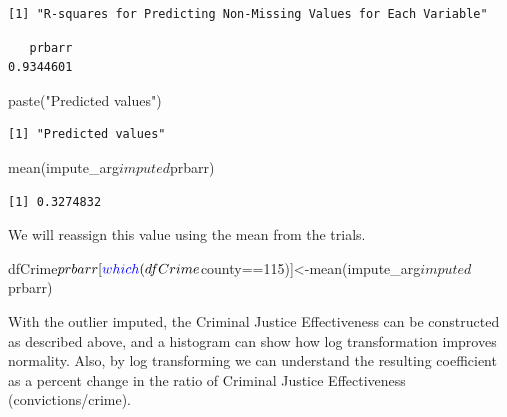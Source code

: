 \documentclass[]{article}
\newenvironment{Shaded}{}{}
\newcommand{\DecValTok}[1]{#1}
\newcommand{\KeywordTok}[1]{\textcolor[rgb]{0.00,0.00,1.00}{#1}}
\newcommand{\NormalTok}[1]{#1}
\newcommand{\OperatorTok}[1]{#1}
\newcommand{\StringTok}[1]{\textcolor[rgb]{0.00,0.50,0.50}{#1}}
\begin{document}
\begin{verbatim}
[1] "R-squares for Predicting Non-Missing Values for Each Variable"
\end{verbatim}

\begin{Shaded}
\end{Shaded}

\begin{verbatim}
   prbarr 
0.9344601 
\end{verbatim}

\begin{Shaded}
\begin{Highlighting}[]
\KeywordTok{paste}\NormalTok{(}\StringTok{"Predicted values"}\NormalTok{)}
\end{Highlighting}
\end{Shaded}

\begin{verbatim}
[1] "Predicted values"
\end{verbatim}

\begin{Shaded}
\begin{Highlighting}[]
\KeywordTok{mean}\NormalTok{(impute_arg}\OperatorTok{$}\NormalTok{imputed}\OperatorTok{$}\NormalTok{prbarr)}
\end{Highlighting}
\end{Shaded}

\begin{verbatim}
[1] 0.3274832
\end{verbatim}

We will reassign this value using the mean from the trials.

\begin{Shaded}
\begin{Highlighting}[]
\NormalTok{dfCrime}\OperatorTok{$}\NormalTok{prbarr[}\KeywordTok{which}\NormalTok{(dfCrime}\OperatorTok{$}\NormalTok{county}\OperatorTok{==}\DecValTok{115}\NormalTok{)]<-}\KeywordTok{mean}\NormalTok{(impute_arg}\OperatorTok{$}\NormalTok{imputed}\OperatorTok{$}\NormalTok{prbarr)}
\end{Highlighting}
\end{Shaded}

With the outlier imputed, the Criminal Justice Effectiveness can be
constructed as described above, and a histogram can show how log
transformation improves normality. Also, by log transforming we can
understand the resulting coefficient as a percent change in the ratio of
Criminal Justice Effectiveness (convictions/crime).
\end{document}
